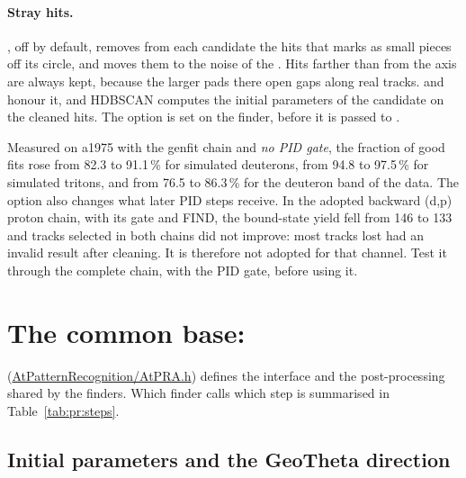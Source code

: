 \paragraph{Stray hits.} , off by default, removes from each
candidate the hits that  marks as small pieces off its circle, and moves them to the
noise of the . Hits farther than  from the axis are always kept, because the
larger pads there open gaps along real tracks.  and  honour it, and
HDBSCAN computes the initial parameters of the candidate on the cleaned hits. The option is set on the finder, before
it is passed to .

Measured on a1975 with the genfit chain and \emph{no PID gate}, the fraction of good fits rose from 82.3 to 91.1\,\% for
simulated deuterons, from 94.8 to 97.5\,\% for simulated tritons, and from 76.5 to 86.3\,\% for the deuteron band of the
data. The option also changes what later PID steps receive. In the adopted backward (d,p) proton chain, with its gate
and FIND, the bound-state yield fell from 146 to 133 and tracks selected in both chains did not improve: most tracks
lost had an invalid  result after cleaning. It is therefore not adopted for that channel. Test it
through the complete chain, with the PID gate, before using it.

\section{The common base: }
\label{sec:pr:base}

 (\url{AtPatternRecognition/AtPRA.h}) defines the interface
 and the post-processing
shared by the finders. Which finder calls which step is summarised in Table~\ref{tab:pr:steps}.

\subsection{Initial parameters and the GeoTheta direction}
\label{sec:pr:geotheta}

